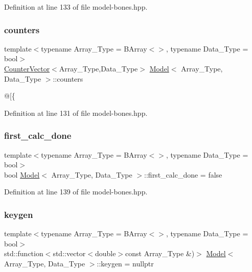 Definition at line 133 of file model-\/bones.\+hpp.

\mbox{\label{class_model_a1a711382ab0593f3b54ad549746e9149}} 
\subsubsection{\texorpdfstring{counters}{counters}}
{\footnotesize\ttfamily template$<$typename Array\+\_\+\+Type  = B\+Array$<$$>$, typename Data\+\_\+\+Type  = bool$>$ \\
\hyperlink{class_counter_vector}{Counter\+Vector}$<$Array\+\_\+\+Type,Data\+\_\+\+Type$>$ \hyperlink{class_model}{Model}$<$ Array\+\_\+\+Type, Data\+\_\+\+Type $>$\+::counters}



@\mbox{[}\{ 



Definition at line 131 of file model-\/bones.\+hpp.

\mbox{\label{class_model_aeef0171c5c34e3e694cb51eebc449596}} 
\subsubsection{\texorpdfstring{first\+\_\+calc\+\_\+done}{first\_calc\_done}}
{\footnotesize\ttfamily template$<$typename Array\+\_\+\+Type  = B\+Array$<$$>$, typename Data\+\_\+\+Type  = bool$>$ \\
bool \hyperlink{class_model}{Model}$<$ Array\+\_\+\+Type, Data\+\_\+\+Type $>$\+::first\+\_\+calc\+\_\+done = false}



Definition at line 139 of file model-\/bones.\+hpp.

\mbox{\label{class_model_a087db7c5e2ee47f4353d2e181223dd5a}} 
\subsubsection{\texorpdfstring{keygen}{keygen}}
{\footnotesize\ttfamily template$<$typename Array\+\_\+\+Type  = B\+Array$<$$>$, typename Data\+\_\+\+Type  = bool$>$ \\
std\+::function$<$std\+::vector$<$double$>$const Array\+\_\+\+Type \&)$>$ \hyperlink{class_model}{Model}$<$ Array\+\_\+\+Type, Data\+\_\+\+Type $>$\+::keygen = nullptr}



